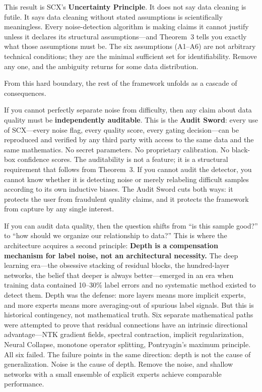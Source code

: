 \documentclass[11pt,a4paper]{article}
\theoremstyle{definition}
\begin{document}
This result is SCX's \textbf{Uncertainty Principle}. It does not say data cleaning is futile. It says data cleaning without stated assumptions is scientifically meaningless. Every noise-detection algorithm is making claims it cannot justify unless it declares its structural assumptions---and Theorem~3 tells you exactly what those assumptions must be. The six assumptions (A1--A6) are not arbitrary technical conditions; they are the minimal sufficient set for identifiability. Remove any one, and the ambiguity returns for some data distribution.

From this hard boundary, the rest of the framework unfolds as a cascade of consequences.

If you cannot perfectly separate noise from difficulty, then any claim about data quality must be \textbf{independently auditable}. This is the \textbf{Audit Sword}: every use of SCX---every noise flag, every quality score, every gating decision---can be reproduced and verified by any third party with access to the same data and the same mathematics. No secret parameters. No proprietary calibration. No black-box confidence scores. The auditability is not a feature; it is a structural requirement that follows from Theorem~3. If you cannot audit the detector, you cannot know whether it is detecting noise or merely relabeling difficult samples according to its own inductive biases. The Audit Sword cuts both ways: it protects the user from fraudulent quality claims, and it protects the framework from capture by any single interest.

If you can audit data quality, then the question shifts from ``is this sample good?'' to ``how should we organize our relationship to data?'' This is where the architecture acquires a second principle: \textbf{Depth is a compensation mechanism for label noise, not an architectural necessity.} The deep learning era---the obsessive stacking of residual blocks, the hundred-layer networks, the belief that deeper is always better---emerged in an era when training data contained 10--30\% label errors and no systematic method existed to detect them. Depth was the defense: more layers means more implicit experts, and more experts means more averaging-out of spurious label signals. But this is historical contingency, not mathematical truth. Six separate mathematical paths were attempted to prove that residual connections have an intrinsic directional advantage---NTK gradient fields, spectral contraction, implicit regularization, Neural Collapse, monotone operator splitting, Pontryagin's maximum principle. All six failed. The failure points in the same direction: depth is not the cause of generalization. Noise is the cause of depth. Remove the noise, and shallow networks with a small ensemble of explicit experts achieve comparable performance.
\end{document}

